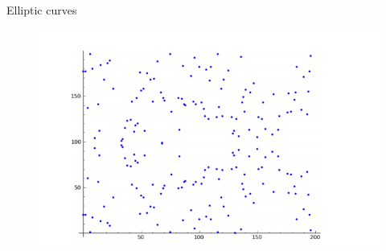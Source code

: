 \documentclass[handout]{beamer}
\begin{document}
\begin{frame}{Elliptic curves}
\begin{figure}
\begin{minipage}{0.48\textwidth}
		\label{fig:elliptic_curve_c}
	\end{minipage}\hfill
	\begin{minipage}{0.48\textwidth}
		\centering
		\includegraphics[width=.7\linewidth]{elliptic_curve_fp}
		\label{fig:elliptic_curve_fp]}
	\end{minipage}
\end{figure}


\end{frame}
\end{document}
